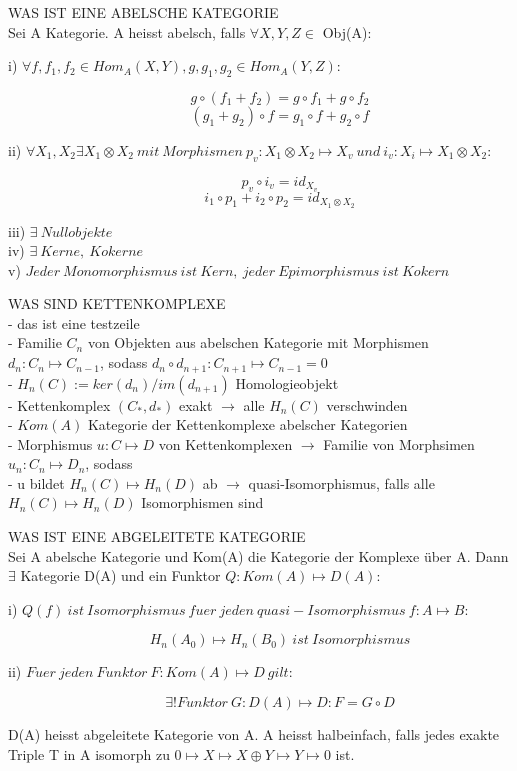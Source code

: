 \documentclass[12pt]{article}
\begin{document}
 WAS IST EINE ABELSCHE KATEGORIE\\

{\large Sei A Kategorie. A heisst abelsch, falls $\forall X,Y,Z \in$ Obj(A):}

\begin{description}
    \item[i) $\forall f,f_1,f_2 \in Hom_A(X,Y), g,g_1,g_2 \in Hom_A(Y,Z):$]
        \[g \circ (f_1 + f_2) = g \circ f_1 + g \circ f_2\]
        \[(g_1 + g_2) \circ f = g_1 \circ f + g_2 \circ f\]
    \item[ii) $\forall X_1,X_2 \exists X_1 \otimes X_2 \: mit \: Morphismen \: p_v : X_1 \otimes X_2 \mapsto X_v \: und \: i_v : X_i \mapsto X_1 \otimes X_2:$]
        \[p_v \circ i_v = id_{X_v}\]
        \[i_1 \circ p_1 + i_2 \circ p_2 = id_{X_1 \otimes X_2}\]
    \item[iii) $\exists \: Nullobjekte$]
    \item[iv) $\exists \: Kerne,\: Kokerne$]
    \item[v) $Jeder \: Monomorphismus \: ist \: Kern, \: jeder \: Epimorphismus \: ist \: Kokern$]   
\end{description}
    
 WAS SIND KETTENKOMPLEXE\\

- das ist eine testzeile \\
- Familie $C_n$ von Objekten aus abelschen Kategorie mit Morphismen $d_n : C_n \mapsto C_{n-1}$, sodass $d_n \circ d_{n+1} : C_{n+1} \mapsto C_{n-1} = 0$ \\
- $H_n(C) := ker(d_n) / im(d_{n+1})$ Homologieobjekt \\
- Kettenkomplex $(C_*, d_*)$ exakt $\rightarrow$ alle $H_n(C)$ verschwinden \\
- $Kom(A)$ Kategorie der Kettenkomplexe abelscher Kategorien \\
- Morphismus $u : C \mapsto D$ von Kettenkomplexen $\rightarrow$ Familie von Morphsimen $u_n : C_n \mapsto D_n$, sodass \\
- u bildet $H_n(C) \mapsto H_n(D)$ ab $\rightarrow$ quasi-Isomorphismus, falls alle $H_n(C) \mapsto H_n(D)$ Isomorphismen sind \\
\newpage

 WAS IST EINE ABGELEITETE KATEGORIE\\

{\large Sei A abelsche Kategorie und Kom(A) die Kategorie der Komplexe über A.
Dann $\exists$ Kategorie D(A) und ein Funktor $Q: Kom(A) \mapsto D(A):$}
\begin{description}
    \item[i) $Q(f) \: ist \: Isomorphismus \: fuer \: jeden \: quasi-Isomorphismus \: f: A \mapsto B$:]
        \[H_n(A_0) \mapsto H_n(B_0) \: ist \: Isomorphismus\]
    \item[ii) $Fuer \: jeden \: Funktor \: F : Kom(A) \mapsto D \: gilt$:]
        \[\exists! Funktor \: G : D(A) \mapsto D: F = G \circ D\]
\end{description}
D(A) heisst abgeleitete Kategorie von A. A heisst halbeinfach, falls jedes exakte Triple
T in A isomorph zu $0 \mapsto X \mapsto X \oplus Y \mapsto Y \mapsto 0$ ist. 
\end{document}
